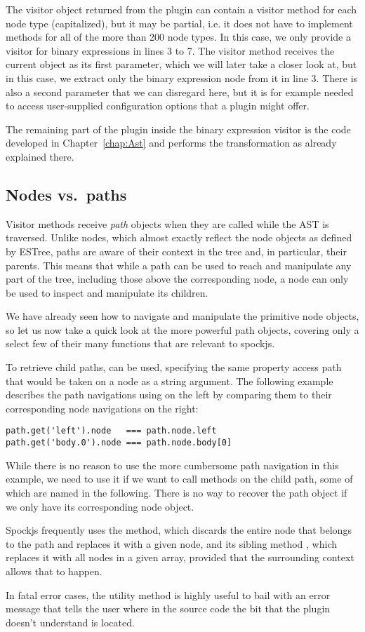 The visitor object returned from the plugin
can contain a visitor method for each node type (capitalized),
but it may be partial, i.e.
it does not have to implement methods for all of the more than 200 node types.
In this case, we only provide a visitor for binary expressions in lines 3 to 7.
The visitor method receives the current  object as its first parameter,
which we will later take a closer look at,
but in this case,
we extract only the binary expression node from it in line 3.
There is also a second  parameter
that we can disregard here, but it is for example needed
to access user-supplied configuration options that a plugin might offer.

The remaining part of the plugin inside the binary expression visitor
is the code developed in Chapter~\ref{chap:Ast}
and performs the transformation as already explained there.

\subsection{Nodes vs.\ paths}
Visitor methods receive \textit{path} objects when they are called while the AST is traversed.
Unlike nodes, which almost exactly reflect the node objects as defined by ESTree,
paths are aware of their context in the tree and, in particular, their parents.
This means that while a path can be used to reach and manipulate any part of the tree,
including those above the corresponding node,
a node can only be used to inspect and manipulate its children.

We have already seen how to navigate and manipulate the primitive node objects,
so let us now take a quick look at the more powerful path objects,
covering only a select few of their many functions that are relevant to spockjs.

To retrieve child paths,  can be used,
specifying the same property access path
that would be taken on a node as a string argument.
The following example describes the path navigations using  on the left
by comparing them to their corresponding node navigations on the right:
\begin{verbatim}
path.get('left').node   === path.node.left
path.get('body.0').node === path.node.body[0]
\end{verbatim}
While there is no reason to use the more cumbersome path navigation in this example,
we need to use it if we want to call methods on the child path,
some of which are named in the following.
There is no way to recover the path object
if we only have its corresponding node object.

Spockjs frequently uses the  method,
which discards the entire node that belongs to the path
and replaces it with a given node,
and its sibling method ,
which replaces it with all nodes in a given array,
provided that the surrounding context allows that to happen.

In fatal error cases, the utility method 
is highly useful to bail with an error message
that tells the user where in the source code
the bit that the plugin doesn't understand is located.

